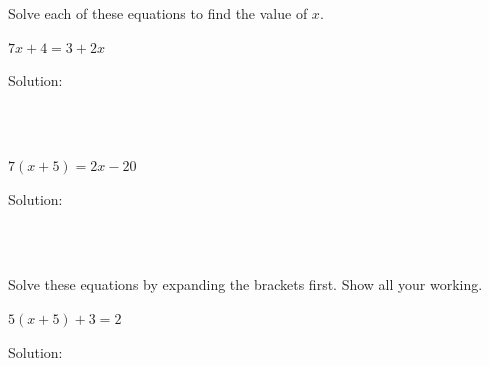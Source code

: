 \clearpage\noindent
Solve each of these equations to find the value of $x$.
\begin{mtask}
    \task \begin{exercise} $7x + 4  =3 + 2x$\\
             \begin{envSolution}
			      Solution:
			      \begin{align*}
			           \quad\quad\quad                             \\[20pt]
                       \quad\quad\quad   \\[10pt]
					   \quad\quad\quad
				 \end{align*}
                 \begin{shortsolution}  
				       $ \quad\quad$
			     \end{shortsolution}				 
               \end{envSolution}
         \end{exercise}
    \task \begin{exercise} $7(x +5) =2x - 20$\\
             \begin{envSolution}
			      Solution:
			      \begin{align*}
			           \quad\quad\quad                             \\[20pt]
                       \quad\quad\quad   \\[10pt]
					   \quad\quad\quad
				 \end{align*}
                 \begin{shortsolution}  
				       $ \quad\quad$
			     \end{shortsolution}				 
               \end{envSolution}
         \end{exercise}
 \end{mtask}


\clearpage\noindent
Solve these equations by expanding the brackets first. Show all your working.
\begin{mtask}
    \task \begin{exercise} $5(x+5)+3 = 2$\\
             \begin{envSolution}
			      Solution:
			      \begin{align*}
			           \quad\quad\quad                             \\[20pt]
                       \quad\quad\quad   \\[10pt]
					   \quad\quad\quad
				 \end{align*}
                 \begin{shortsolution}  
				       $ \quad\quad$
			     \end{shortsolution}				 
               \end{envSolution}
         \end{exercise}
 \end{mtask}


